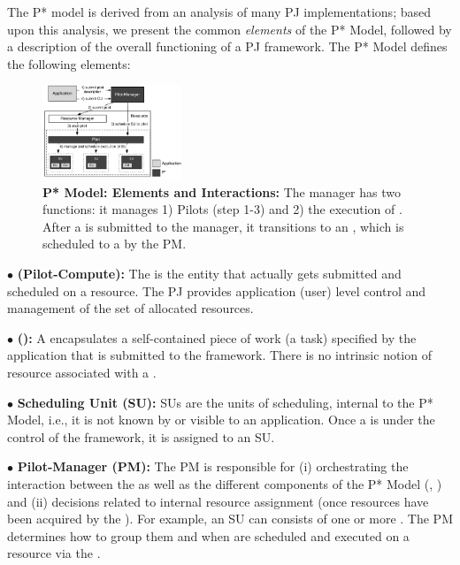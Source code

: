 \documentclass{sig-alt-release2}
\begin{document}
The P* model is derived from an analysis of many PJ implementations;
based upon this analysis, we present the common {\it elements} of the P*
Model, followed by a description of the overall functioning of a PJ framework. 
The P* Model defines the following elements:

\begin{figure}[t]
	\upp\upp
    \centering
    \includegraphics[width=0.37\textwidth]{figures/pstar_model_single.pdf}
    \caption{ \textbf{P* Model: Elements and
        Interactions:} The manager has two functions: it manages 1)
      Pilots (step 1-3) and 2) the execution of \cus. After a \cu is
      submitted to the manager, it transitions to an \su, which is
      scheduled to a \pilot by the PM.}
	\upp\upp
    \label{fig:figures_pstar}
\end{figure}


\noindent$\bullet$ \textbf{\pilot (Pilot-Compute):} The \pilot is the
  entity that actually gets submitted and scheduled on a resource.
  The PJ provides application (user)
  level control and management of the set of allocated resources.



\noindent$\bullet$ \textbf{\computeunit  (\cu):} A \cu  encapsulates a 
  self-contained piece of work (a task) specified by the application that is
  submitted to the \pilotjob framework. There is no intrinsic notion
  of resource associated with a \cu.

\noindent$\bullet$ \textbf{Scheduling Unit (SU):} SUs are the units of 
  scheduling, internal to the P* Model, i.e., it is not known by or
  visible to an application. Once a \cu is
  under the control of the \pilotjob framework, it is assigned
  to an SU.


\noindent$\bullet$ \textbf{Pilot-Manager (PM):} The PM is responsible for (i)
  orchestrating the interaction between the \pilots as well as the
  different components of the P* Model (\cus, \sus) and (ii) decisions
  related to internal resource assignment (once resources have been
  acquired by the \pilotjob).  For example, an SU can consists of one
  or more \cus. %
  The PM determines how to group them and when \sus are scheduled and
  executed on a resource via the \pilot.
\end{document}
